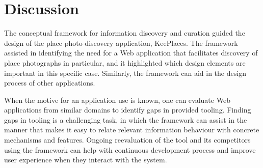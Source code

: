 {\section{Discussion}
The conceptual framework for information discovery and curation guided the design of the place photo discovery application, KeePlaces. The framework assisted in identifying the need for a Web application that facilitates discovery of place photographs in particular, and it highlighted which design elements are important in this specific case. Similarly, the framework can aid in the design process of other applications. 

When the motive for an application use is known, one can evaluate Web applications from similar domains to identify gaps in provided tooling. Finding gaps in tooling is a challenging task, in which the framework can assist in the manner that makes it easy to relate relevant information behaviour with concrete mechanisms and features. Ongoing reevaluation of the tool and its competitors using the framework can help with continuous development process and improve user experience when they interact with the system.
} %




